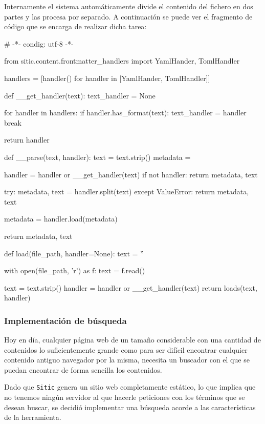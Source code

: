 Internamente el sistema automáticamente divide el contenido del fichero en dos partes y las procesa por separado.
A continuación se puede ver el fragmento de código que se encarga de realizar dicha tarea:

\begin{pythoncode}
# -*- condig: utf-8 -*-

from sitic.content.frontmatter_handlers import YamlHander, TomlHandler


handlers = [handler() for handler in [YamlHander, TomlHandler]]

def __get_handler(text):
    text_handler = None

    for handler in handlers:
        if handler.has_format(text):
            text_handler = handler
            break

    return handler


def __parse(text, handler):
    text = text.strip()
    metadata = {}

    handler = handler or __get_handler(text)
    if not handler:
        return metadata, text


    try:
        metadata, text = handler.split(text)
    except ValueError:
        return metadata, text

    metadata = handler.load(metadata)

    return metadata, text


def load(file_path, handler=None):
    text = ''

    with open(file_path, 'r') as f:
        text = f.read()

    text = text.strip()
    handler = handler or __get_handler(text)
    return loads(text, handler)
\end{pythoncode}

\subsubsection{Implementación de búsqueda}

Hoy en día, cualquier página web de un tamaño considerable con una cantidad de contenidos lo suficientemente
grande como para ser difícil encontrar cualquier contenido antiguo navegador por la misma, necesita un
buscador con el que se puedan encontrar de forma sencilla los contenidos.

Dado que \texttt{Sitic} genera un sitio web completamente estático, lo que implica que no tenemos ningún
servidor al que hacerle peticiones con los términos que se desean buscar, se decidió implementar
una búsqueda acorde a las características de la herramienta.

